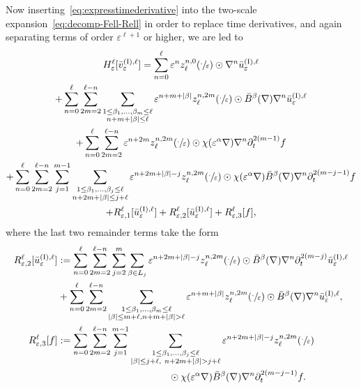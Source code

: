 \documentclass[10pt]{amsart}
\theoremstyle{plain}
\theoremstyle{definition}
\numberwithin{equation}{section}
\newcommand{\e}{\varepsilon}
\begin{document}
Now inserting~\eqref{eq:expresstimederivative} into the two-scale expansion~\eqref{eq:decomp-Fell-Rell} in order to replace time derivatives, and again {separating} terms of order $\e^{\ell+1}$ or higher, we are led to
\begin{multline}\label{eq:Fell-decomp-final-ploplop}
H^\ell_\e[\bar v_\e^{\text{(I)},\ell}]
=
\sum_{n=0}^\ell\e^{n}z^{n,0}_\ell(\sfrac{\cdot}{\e})\odot\nabla^n\bar{u}^{\text{(I)},\ell}_{\e}\\
+\sum_{n=0}^\ell\sum_{2m=2}^{\ell-n}\sum_{\substack{1\le \beta_1,\ldots,\beta_{m}\le \ell\\ n+m+|\beta|\le\ell}}\e^{n+m+|\beta|}z^{n,2m}_\ell(\sfrac{\cdot}{\e})\odot \bar B^\beta(\nabla)\nabla^n\bar{u}^{\text{(I)},\ell}_{\e}\\
+\sum_{n=0}^\ell\sum_{2m=2}^{\ell-n}\e^{n+2m}z^{n,2m}_\ell(\sfrac{\cdot}{\e})\odot\chi(\e^{\alpha}\nabla)\nabla^n\partial_t^{2(m-1)}f\\
+\sum_{n=0}^\ell\sum_{2m=2}^{\ell-n}\sum_{j=1}^{m-1}\sum_{\substack{1\le \beta_1,\ldots,\beta_j\le\ell\\ n+2m+|\beta|\le j+\ell}}\e^{n+2m+|\beta|-j}z^{n,2m}_\ell(\sfrac{\cdot}{\e})\odot\chi(\e^{\alpha}\nabla)\bar B^\beta(\nabla)\nabla^n\partial_t^{2(m-j-1)}f\\
+R^{\ell}_{\e,1}[\bar u_{\e}^{\text{(I)},\ell}]+R^{\ell}_{\e,2}[\bar u_{\e}^{\text{(I)},\ell}]+R^{\ell}_{\e,3}[f],
\end{multline}
where the last two remainder terms take the form
\begin{align*}
R^{\ell}_{\e,2}[\bar u_{\e}^{\text{(I)},\ell}]&:= \sum_{n=0}^\ell\sum_{2m=2}^{\ell-n}\sum_{j=2}^m\sum_{\beta\in L_j}\e^{n+2m+|\beta|-j}z_\ell^{n,2m}(\sfrac{\cdot}{\e})\odot\bar B^\beta(\nabla)\nabla^n\partial_t^{2(m-j)}\bar u^{\text{(I)},\ell}_\e\\
&+\sum_{n=0}^\ell\sum_{2m=2}^{\ell-n}\sum_{\substack{1\le \beta_1,\ldots,\beta_{m}\le \ell\\|\beta|\le m+\ell,n+m+|\beta|>\ell}}\e^{n+m+|\beta|}z_\ell^{n,2m}(\sfrac{\cdot}{\e})\odot\bar B^\beta(\nabla)\nabla^n\bar{u}^{\text{(I)},\ell}_{\e},\\
R^{\ell}_{\e,3}[f]&:= \sum_{n=0}^\ell\sum_{2m=2}^{\ell-n}\sum_{j=1}^{m-1}\sum_{\substack{1\le \beta_1,\ldots,\beta_j\le\ell\\ |\beta|\le j+\ell,~n+2m+|\beta|>j+\ell}}\e^{n+2m+|\beta|-j} z_\ell^{n,2m}(\sfrac{\cdot}{\e})\\
&\hspace{4cm}\odot\chi(\e^{\alpha}\nabla)\bar B^\beta(\nabla)\nabla^n\partial_t^{2(m-j-1)}f.
\end{align*}
\end{document}
